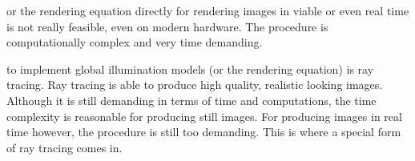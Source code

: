\documentclass[%
    a4paper,
    nobib,   %
    openany  %
]{tufte-book}
\begin{document}

 or the rendering equation
directly for rendering images in viable or even real time is not really
feasible, even on modern hardware. The procedure is computationally complex and
very time demanding.

 to implement global illumination models (or
the rendering equation) is ray tracing. Ray tracing is able to produce high
quality, realistic looking images. Although it is still demanding in terms of
time and computations, the time complexity is reasonable for producing still
images. For producing images in real time however, the procedure is still too
demanding. This is where a special form of ray tracing comes in.
\end{document}
